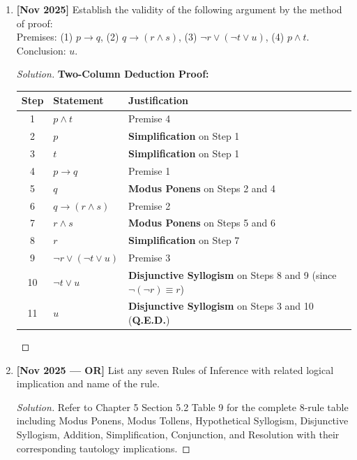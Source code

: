 \documentclass[11pt,a4paper]{article}
\newenvironment{sol}{\begin{proof}[Solution]}{\end{proof}}
\begin{document}
\begin{enumerate}[leftmargin=1.5em, label=\textbf{Q\arabic*:}]
    \item \textbf{[Nov 2025]} Establish the validity of the following argument by the method of proof: \\
    Premises: (1) $p \rightarrow q$, (2) $q \rightarrow (r \land s)$, (3) $\neg r \lor (\neg t \lor u)$, (4) $p \land t$. \\
    Conclusion: $u$.
    \begin{sol}
    \textbf{Two-Column Deduction Proof:}
    \begin{table}[htbp]
    \centering
    \small
    \begin{tabularx}{\textwidth}{|c|X|X|}
    \hline
    \textbf{Step} & \textbf{Statement} & \textbf{Justification} \\ \hline
    1 & $p \land t$ & Premise 4 \\ \hline
    2 & $p$ & \textbf{Simplification} on Step 1 \\ \hline
    3 & $t$ & \textbf{Simplification} on Step 1 \\ \hline
    4 & $p \rightarrow q$ & Premise 1 \\ \hline
    5 & $q$ & \textbf{Modus Ponens} on Steps 2 and 4 \\ \hline
    6 & $q \rightarrow (r \land s)$ & Premise 2 \\ \hline
    7 & $r \land s$ & \textbf{Modus Ponens} on Steps 5 and 6 \\ \hline
    8 & $r$ & \textbf{Simplification} on Step 7 \\ \hline
    9 & $\neg r \lor (\neg t \lor u)$ & Premise 3 \\ \hline
    10 & $\neg t \lor u$ & \textbf{Disjunctive Syllogism} on Steps 8 and 9 (since $\neg(\neg r) \equiv r$) \\ \hline
    11 & \textbf{$u$} & \textbf{Disjunctive Syllogism} on Steps 3 and 10 (\textbf{Q.E.D.}) \\ \hline
    \end{tabularx}
    \end{table}
    \end{sol}
    \vspace{6pt}

    \item \textbf{[Nov 2025 --- OR]} List any seven Rules of Inference with related logical implication and name of the rule.
    \begin{sol}
    Refer to Chapter 5 Section 5.2 Table 9 for the complete 8-rule table including Modus Ponens, Modus Tollens, Hypothetical Syllogism, Disjunctive Syllogism, Addition, Simplification, Conjunction, and Resolution with their corresponding tautology implications.
    \end{sol}
    \vspace{6pt}


\end{enumerate}
\end{document}
